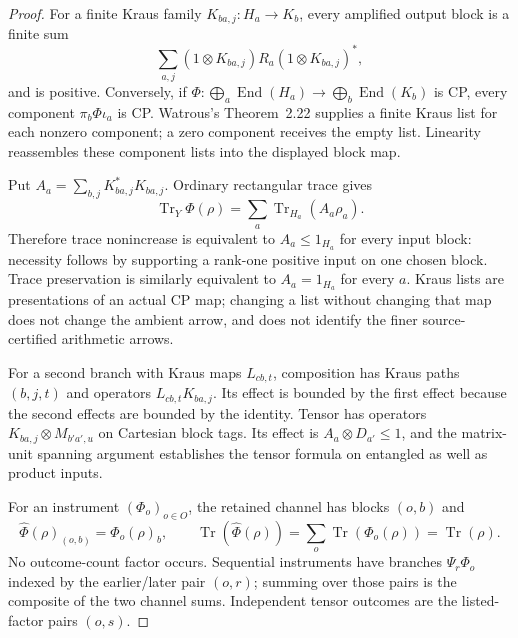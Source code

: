 \begin{proof}
For a finite Kraus family $K_{ba,j}:H_a\to K_b$, every amplified output
block is a finite sum
\[
 \sum_{a,j}(1\otimes K_{ba,j})R_a(1\otimes K_{ba,j})^*,
\]
and is positive.  Conversely, if
$\Phi:\bigoplus_a\operatorname{End}(H_a)\to
\bigoplus_b\operatorname{End}(K_b)$ is CP, every component
$\pi_b\Phi\iota_a$ is CP.  Watrous's Theorem~2.22 supplies a finite Kraus
list for each nonzero component; a zero component receives the empty list.
Linearity reassembles these component lists into the displayed block map.

Put $A_a=\sum_{b,j}K_{ba,j}^*K_{ba,j}$.  Ordinary rectangular trace gives
\[
 \operatorname{Tr}_Y\Phi(\rho)
 =\sum_a\operatorname{Tr}_{H_a}(A_a\rho_a).
\]
Therefore trace nonincrease is equivalent to $A_a\leq1_{H_a}$ for every
input block: necessity follows by supporting a rank-one positive input on
one chosen block.  Trace preservation is similarly equivalent to
$A_a=1_{H_a}$ for every $a$.  Kraus lists are presentations of an actual CP
map; changing a list without changing that map does not change the ambient
arrow, and does not identify the finer source-certified arithmetic arrows.

For a second branch with Kraus maps $L_{cb,t}$, composition has Kraus paths
$(b,j,t)$ and operators $L_{cb,t}K_{ba,j}$.  Its effect is bounded by the
first effect because the second effects are bounded by the identity.  Tensor
has operators $K_{ba,j}\otimes M_{b'a',u}$ on Cartesian block tags.  Its
effect is $A_a\otimes D_{a'}\leq1$, and the matrix-unit spanning argument
establishes the tensor formula on entangled as well as product inputs.

For an instrument $(\Phi_o)_{o\in O}$, the retained channel has blocks
$(o,b)$ and
\[
 \widehat\Phi(\rho)_{(o,b)}=\Phi_o(\rho)_b,
 \qquad
 \operatorname{Tr}(\widehat\Phi(\rho))
 =\sum_o\operatorname{Tr}(\Phi_o(\rho))
 =\operatorname{Tr}(\rho).
\]
No outcome-count factor occurs.  Sequential instruments have branches
$\Psi_r\Phi_o$ indexed by the earlier/later pair $(o,r)$; summing over those
pairs is the composite of the two channel sums.  Independent tensor outcomes
are the listed-factor pairs $(o,s)$.


\end{proof}
